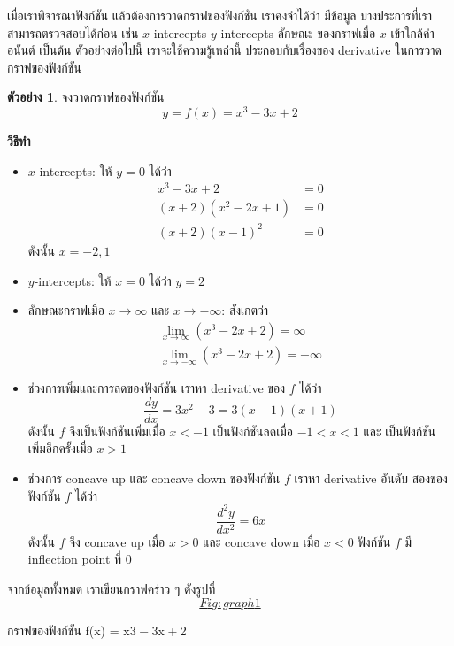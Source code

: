 \documentclass[
]{book}
\theoremstyle{definition}
\theoremstyle{definition}
\newtheorem{example}{ตัวอย่าง}[chapter]
\theoremstyle{definition}
\theoremstyle{definition}
\theoremstyle{remark}
\begin{document}
เมื่อเราพิจารณาฟังก์ชัน แล้วต้องการวาดกราฟของฟังก์ชัน เราคงจำได้ว่า มีข้อมูล
บางประการที่เราสามารถตรวจสอบได้ก่อน เช่น \(x\)-intercepts \(y\)-intercepts ลักษณะ
ของกราฟเมื่อ \(x\) เข้าใกล้ค่าอนันต์ เป็นต้น ตัวอย่างต่อไปนี้ เราจะใช้ความรู้เหล่านี้
ประกอบกับเรื่องของ derivative ในการวาดกราฟของฟังก์ชัน

\begin{example}
จงวาดกราฟของฟังก์ชัน \[y = f(x) =  x^3-3x+2\]
\end{example}

\textbf{วิธีทำ}

\begin{itemize}
\item
  \(x\)-intercepts: ให้ \(y=0\) ได้ว่า \begin{equation}   \begin{aligned}
      x^3-3x+2 &= 0 \\
      (x+2)(x^2-2x+1) &= 0 \\
      (x+2)(x-1)^2 &= 0
    \end{aligned} \end{equation} ดังนั้น \(x=-2, 1\)
\item
  \(y\)-intercepts: ให้ \(x=0\) ได้ว่า \(y=2\)
\item
  ลักษณะกราฟเมื่อ \(x \to \infty\) และ \(x \to -\infty\): สังเกตว่า
  \begin{equation}   \begin{aligned}
      \lim_{x\to \infty} (x^3-2x+2) = \infty \\
      \lim_{x\to -\infty} (x^3-2x+2) = -\infty
    \end{aligned} \end{equation}
\item
  ช่วงการเพิ่มและการลดของฟังก์ชัน เราหา derivative ของ \(f\) ได้ว่า
  \[\frac{dy}{dx} = 3x^2-3 = 3(x-1)(x+1)\] ดังนั้น \(f\) จึงเป็นฟังก์ชันเพิ่มเมื่อ
  \(x < -1\) เป็นฟังก์ชันลดเมื่อ \(-1 < x < 1\) และ เป็นฟังก์ชันเพิ่มอีกครั้งเมื่อ \(x>1\)
\item
  ช่วงการ concave up และ concave down ของฟังก์ชัน \(f\) เราหา derivative
  อันดับ สองของฟังก์ชัน \(f\) ได้ว่า \[\frac{d^2y}{dx^2} = 6x\] ดังนั้น \(f\) จึง
  concave up เมื่อ \(x>0\) และ concave down เมื่อ \(x<0\) ฟังก์ชัน \(f\) มี
  inflection point ที่ \(0\)
\end{itemize}

จากข้อมูลทั้งหมด เราเขียนกราฟคร่าว ๆ
ดังรูปที่~\hyperref[Fig:graph1]{\[Fig:graph1\]}

กราฟของฟังก์ชัน
{f(x) = x3 − 3x + 2}
\end{document}
